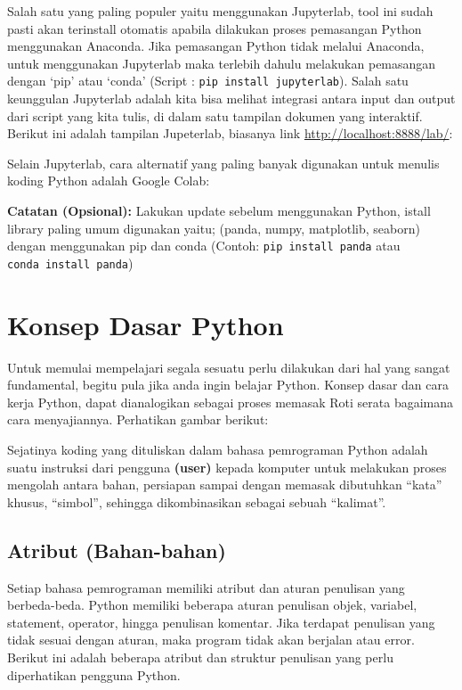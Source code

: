 \documentclass[
]{docs}
\begin{document}
Salah satu yang paling populer yaitu menggunakan Jupyterlab, tool ini sudah pasti akan terinstall otomatis apabila dilakukan proses pemasangan Python menggunakan Anaconda. Jika pemasangan Python tidak melalui Anaconda, untuk menggunakan Jupyterlab maka terlebih dahulu melakukan pemasangan dengan `pip' atau `conda' (Script : \texttt{pip\ install\ jupyterlab}). Salah satu keunggulan Jupyterlab adalah kita bisa melihat integrasi antara input dan output dari script yang kita tulis, di dalam satu tampilan dokumen yang interaktif. Berikut ini adalah tampilan Jupeterlab, biasanya link \url{http://localhost:8888/lab/}:

Selain Jupyterlab, cara alternatif yang paling banyak digunakan untuk menulis koding Python adalah Google Colab:

\textbf{Catatan (Opsional):} Lakukan update sebelum menggunakan Python, istall library paling umum digunakan yaitu; (panda, numpy, matplotlib, seaborn) dengan menggunakan pip dan conda (Contoh: \texttt{pip\ install\ panda} atau \texttt{conda\ install\ panda})

\hypertarget{konsep-dasar-python}{%
\section{Konsep Dasar Python}\label{konsep-dasar-python}}

Untuk memulai mempelajari segala sesuatu perlu dilakukan dari hal yang sangat fundamental, begitu pula jika anda ingin belajar Python. Konsep dasar dan cara kerja Python, dapat dianalogikan sebagai proses memasak Roti serata bagaimana cara menyajiannya. Perhatikan gambar berikut:

Sejatinya koding yang dituliskan dalam bahasa pemrograman Python adalah suatu instruksi dari pengguna \textbf{(user)} kepada komputer untuk melakukan proses mengolah antara bahan, persiapan sampai dengan memasak dibutuhkan ``kata'' khusus, ``simbol'', sehingga dikombinasikan sebagai sebuah ``kalimat''.

\hypertarget{atribut-bahan-bahan}{%
\subsection{Atribut (Bahan-bahan)}\label{atribut-bahan-bahan}}

Setiap bahasa pemrograman memiliki atribut dan aturan penulisan yang berbeda-beda. Python memiliki beberapa aturan penulisan objek, variabel, statement, operator, hingga penulisan komentar. Jika terdapat penulisan yang tidak sesuai dengan aturan, maka program tidak akan berjalan atau error. Berikut ini adalah beberapa atribut dan struktur penulisan yang perlu diperhatikan pengguna Python.
\end{document}
